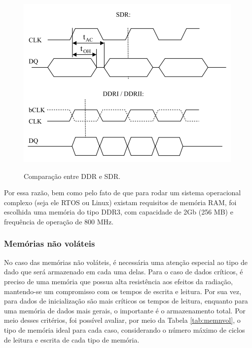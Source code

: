 \begin{figure}[H]
    \centering
    \caption{Comparação entre DDR e SDR.}
    \includegraphics[scale=1]{images/ddrsdr.png}
    \label{fig:sdrvsddr}
\end{figure}
 
Por essa razão, bem como pelo fato de que para rodar um sistema operacional complexo (seja ele RTOS ou Linux) existam requisitos de memória RAM, foi escolhida uma memória do tipo DDR3, com capacidade de 2Gb (256 MB) e frequência de operação de 800 MHz.

\subsubsection{Memórias não voláteis}

No caso das memórias não voláteis, é necessária uma atenção especial ao tipo de dado que será armazenado em cada uma delas. Para o caso de dados críticos, é preciso de uma memória que possua alta resistência aos efeitos da radiação, mantendo-se um compromisso com os tempos de escrita e leitura. Por sua vez, para dados de inicialização são mais críticos os tempos de leitura, enquanto para uma memória de dados mais gerais, o importante é o armazenamento total. Por meio desses critérios, foi possível avaliar, por meio da Tabela \ref{tab:memnvol}, o tipo de memória ideal para cada caso, considerando o número máximo de ciclos de leitura e escrita de cada tipo de memória.

